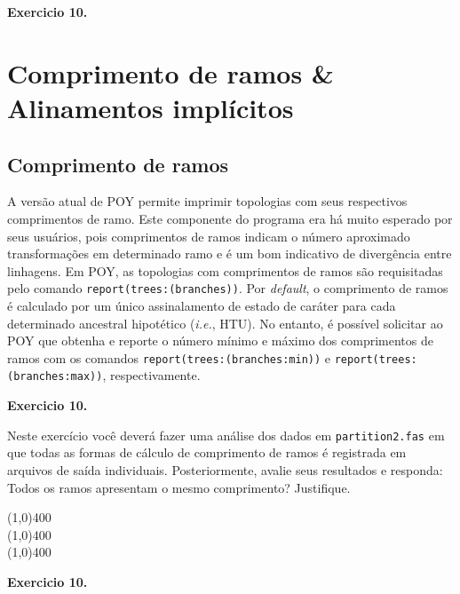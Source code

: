 \begin{refsection}
\begin{blackBlock}{\textbf{Exercicio 10.}}
\end{blackBlock}

\section{Comprimento de ramos \& Alinamentos implícitos}\label{tut10:sa:brlenia}

\subsection{Comprimento de ramos}\label{tut10:sa:brlen}

A versão atual de POY permite imprimir topologias com seus respectivos comprimentos de ramo. Este componente do programa era há muito esperado por seus usuários, pois comprimentos de ramos indicam o número aproximado transformações em determinado ramo e é um bom indicativo de divergência entre linhagens. Em POY, as topologias com comprimentos de ramos são requisitadas pelo comando \texttt{report(trees:(branches))}. Por \textit{default}, o comprimento de ramos é calculado por um único assinalamento de estado de caráter para cada determinado ancestral hipotético (\textit{i.e.}, HTU). No entanto, é possível solicitar ao POY que obtenha e reporte o número mínimo e máximo dos comprimentos de ramos com os comandos \texttt{report(trees:(branches:min))} e \texttt{report(trees:(branches:max))}, respectivamente.\\

\begin{blackBlock}{\textbf{Exercicio 10.}}\label{tut10:ex:10.2}

Neste exercício você deverá fazer uma análise dos dados em \texttt{partition2.fas} em que todas as formas de cálculo de comprimento de ramos é registrada em arquivos de saída individuais. Posteriormente, avalie seus resultados e responda: Todos os ramos apresentam o mesmo comprimento? Justifique.

\end{blackBlock}

\begin{center}
\line(1,0){400}\\
\line(1,0){400}\\
\line(1,0){400}\\
\end{center}

\vspace{30pt}

\begin{blackBlock}{\textbf{Exercicio 10.}}\label{tut10:ex:10.3}


\end{blackBlock}
\end{refsection}
